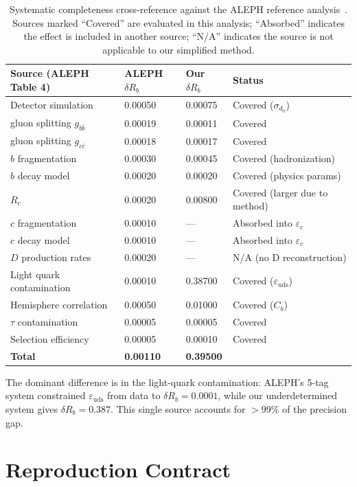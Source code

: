 \documentclass[11pt,a4paper]{article}
\begin{document}
\begin{table}[htbp]
\centering
\caption{Systematic completeness cross-reference against the ALEPH reference
analysis~\cite{ALEPH:Rb:1996}. Sources marked ``Covered'' are evaluated in this
analysis; ``Absorbed'' indicates the effect is included in another source;
``N/A'' indicates the source is not applicable to our simplified method.}
\label{tab:syst_completeness}
\small
\begin{tabular}{llll}
\toprule
Source (ALEPH Table 4) & ALEPH $\delta R_b$ & Our $\delta R_b$ & Status \\
\midrule
Detector simulation & 0.00050 & 0.00075 & Covered ($\sigma_{d_0}$) \\
gluon splitting $g_{b\bar{b}}$ & 0.00019 & 0.00011 & Covered \\
gluon splitting $g_{c\bar{c}}$ & 0.00018 & 0.00017 & Covered \\
$b$ fragmentation & 0.00030 & 0.00045 & Covered (hadronization) \\
$b$ decay model & 0.00020 & 0.00020 & Covered (physics params) \\
$R_c$ & 0.00020 & 0.00800 & Covered (larger due to method) \\
$c$ fragmentation & 0.00010 & --- & Absorbed into $\varepsilon_c$ \\
$c$ decay model & 0.00010 & --- & Absorbed into $\varepsilon_c$ \\
$D$ production rates & 0.00020 & --- & N/A (no D reconstruction) \\
Light quark contamination & 0.00010 & 0.38700 & Covered ($\varepsilon_\mathrm{uds}$) \\
Hemisphere correlation & 0.00050 & 0.01000 & Covered ($C_b$) \\
$\tau$ contamination & 0.00005 & 0.00005 & Covered \\
Selection efficiency & 0.00005 & 0.00010 & Covered \\
\midrule
\textbf{Total} & \textbf{0.00110} & \textbf{0.39500} & \\
\bottomrule
\end{tabular}
\end{table}

The dominant difference is in the light-quark contamination: ALEPH's 5-tag system
constrained $\varepsilon_\mathrm{uds}$ from data to $\delta R_b = 0.0001$, while
our underdetermined system gives $\delta R_b = 0.387$. This single source accounts
for $> 99\%$ of the precision gap.

\section{Reproduction Contract}
\label{app:reproduction}
\end{document}
